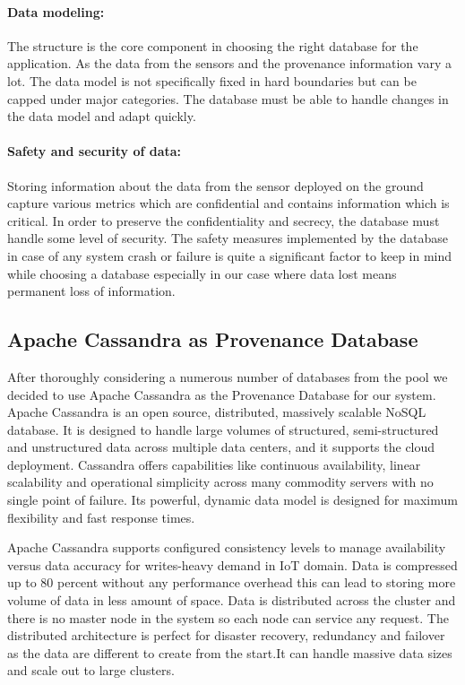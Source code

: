 \paragraph*{Data modeling:}
The structure is the core component in choosing the right database for the application. As the data from the sensors and the provenance information vary a lot. The data model is not specifically fixed in hard boundaries but can be capped under major categories. The database must be able to handle changes in the data model and adapt quickly.

\paragraph*{Safety and security of data:}
Storing information about the data from the sensor deployed on the ground capture various metrics which are confidential and contains information which is critical. In order to preserve the confidentiality and secrecy, the database must handle some level of security. The safety measures implemented by the database in case of any system crash or failure is quite a significant factor to keep in mind while choosing a database especially in our case where data lost means permanent loss of information.

\subsection{Apache Cassandra as Provenance Database}

After thoroughly considering a numerous number of databases from the pool we decided to use Apache Cassandra as the Provenance Database for our system.
Apache Cassandra is an open source, distributed, massively scalable NoSQL database. It is designed to handle large volumes of structured, semi-structured and unstructured data across multiple data centers, and it supports the cloud deployment. Cassandra offers capabilities like continuous availability, linear scalability and operational simplicity across many commodity servers with no single point of failure. Its powerful, dynamic data model is designed for maximum flexibility and fast response times. 

Apache Cassandra supports configured consistency levels to manage availability versus data accuracy for writes-heavy demand in IoT domain.  Data is compressed up to 80 percent without any performance overhead this can lead to storing more volume of data in less amount of space. 
Data is distributed across the cluster and there is no master node in the system so each node can service any request. The distributed architecture is perfect for disaster recovery, redundancy and failover as the data are different to create from the start.It can handle massive data sizes and scale out to large clusters. 

